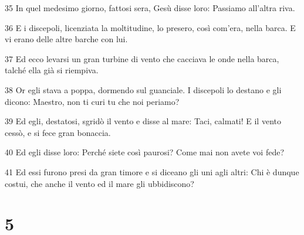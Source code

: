 \par 35 In quel medesimo giorno, fattosi sera, Gesù disse loro: Passiamo all'altra riva.
\par 36 E i discepoli, licenziata la moltitudine, lo presero, così com'era, nella barca. E vi erano delle altre barche con lui.
\par 37 Ed ecco levarsi un gran turbine di vento che cacciava le onde nella barca, talché ella già si riempiva.
\par 38 Or egli stava a poppa, dormendo sul guanciale. I discepoli lo destano e gli dicono: Maestro, non ti curi tu che noi periamo?
\par 39 Ed egli, destatosi, sgridò il vento e disse al mare: Taci, calmati! E il vento cessò, e si fece gran bonaccia.
\par 40 Ed egli disse loro: Perché siete così paurosi? Come mai non avete voi fede?
\par 41 Ed essi furono presi da gran timore e si diceano gli uni agli altri: Chi è dunque costui, che anche il vento ed il mare gli ubbidiscono?

\chapter{5}

